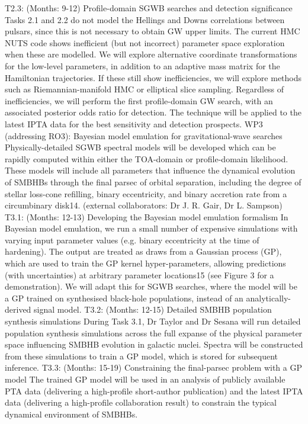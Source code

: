 \documentclass[11pt,letterpaper,sans]{moderncv} %
\begin{document}
	T2.3: (Months: 9-12) Profile-domain SGWB searches and detection significance
	Tasks 2.1 and 2.2 do not model the Hellings and Downs correlations between pulsars, since this is not necessary to obtain GW upper limits. The current HMC NUTS code shows inefficient (but not incorrect) parameter space exploration when these are modelled. We will explore alternative coordinate transformations for the low-level parameters, in addition to an adaptive mass matrix for the Hamiltonian trajectories. If these still show inefficiencies, we will explore methods such as Riemannian-manifold HMC or elliptical slice sampling. Regardless of inefficiencies, we will perform the first profile-domain GW search, with an associated posterior odds ratio for detection. The technique will be applied to the latest IPTA data for the best sensitivity and detection prospects.
WP3 (addressing RO3): Bayesian model emulation for gravitational-wave searches
Physically-detailed SGWB spectral models will be developed which can be rapidly computed within either the TOA-domain or profile-domain likelihood. These models will include all parameters that influence the dynamical evolution of SMBHBs through the final parsec of orbital separation, including the degree of stellar loss-cone refilling, binary eccentricity, and binary accretion rate from a circumbinary disk14. (external collaborators: Dr J. R. Gair, Dr L. Sampson)
T3.1: (Months: 12-13) Developing the Bayesian model   
                                       emulation formalism
In Bayesian model emulation, we run a small number of expensive simulations with varying input parameter values (e.g. binary eccentricity at the time of hardening). The output are treated as draws from a Gaussian process (GP), which are used to train the GP kernel hyper-parameters, allowing predictions (with uncertainties) at arbitrary parameter locations15 (see Figure 3 for a demonstration). We will adapt this for SGWB searches, where the model will be a GP trained on synthesised black-hole populations, instead of an analytically-derived signal model.
	T3.2: (Months: 12-15) Detailed SMBHB population synthesis simulations
During Task 3.1, Dr Taylor and Dr Sesana will run detailed population synthesis simulations across the full expanse of the physical parameter space influencing SMBHB evolution in galactic nuclei. Spectra will be constructed from these simulations to train a GP model, which is stored for subsequent inference.
	T3.3: (Months: 15-19) Constraining the final-parsec problem with a GP model
The trained GP model will be used in an analysis of publicly available PTA data (delivering a high-profile short-author publication) and the latest IPTA data (delivering a high-profile collaboration result) to constrain the typical dynamical environment of SMBHBs. 
\end{document}
